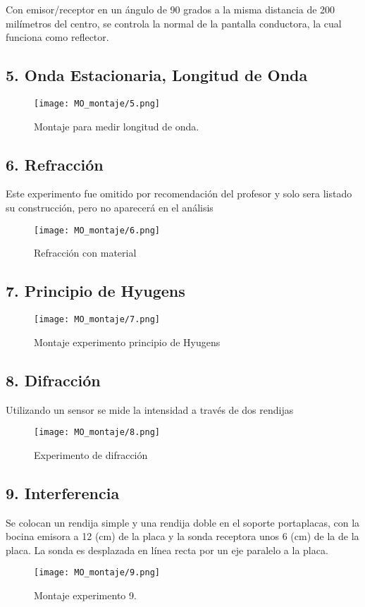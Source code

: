 \documentclass[a4paper,twocolumn,10pt]{article}
\begin{document}
Con emisor/receptor en un ángulo de 90 grados a la misma distancia de 200 milímetros del centro, se controla la normal de la pantalla conductora, la cual funciona como reflector.

\subsection*{5. Onda Estacionaria, Longitud de Onda}
\begin{figure}[H]
    \centering
    \texttt{[image: MO\_montaje/5.png]}
    \caption{Montaje para medir longitud de onda.}
    \label{fig:my_label}
\end{figure}

\subsection*{6. Refracción}
Este experimento fue omitido por recomendación del profesor y solo sera listado su construcción, pero no aparecerá en el análisis
\begin{figure}[H]
    \centering
    \texttt{[image: MO\_montaje/6.png]}
    \caption{Refracción con material}
    \label{fig:montrefr}
\end{figure}

\subsection*{7. Principio de Hyugens}
\begin{figure}[H]
    \centering
    \texttt{[image: MO\_montaje/7.png]}
    \caption{Montaje experimento principio de Hyugens}
    \label{fig:hyu}
\end{figure}

\subsection*{8. Difracción}
Utilizando un sensor se mide la intensidad a través de dos rendijas
\begin{figure}[H]
    \centering
    \texttt{[image: MO\_montaje/8.png]}
    \caption{Experimento de difracción}
    \label{fig:montdif}
\end{figure}

\subsection*{9. Interferencia}
Se colocan un rendija simple y una rendija doble en el soporte portaplacas, con la bocina emisora a 12 (cm) de la placa y la sonda receptora unos 6 (cm) de la de la placa. La sonda es desplazada en línea recta por un eje paralelo a la placa.
\begin{figure}[H]
    \centering
    \texttt{[image: MO\_montaje/9.png]}
    \caption{Montaje experimento 9.}
    \label{fig:montinter}
\end{figure}
\end{document}
